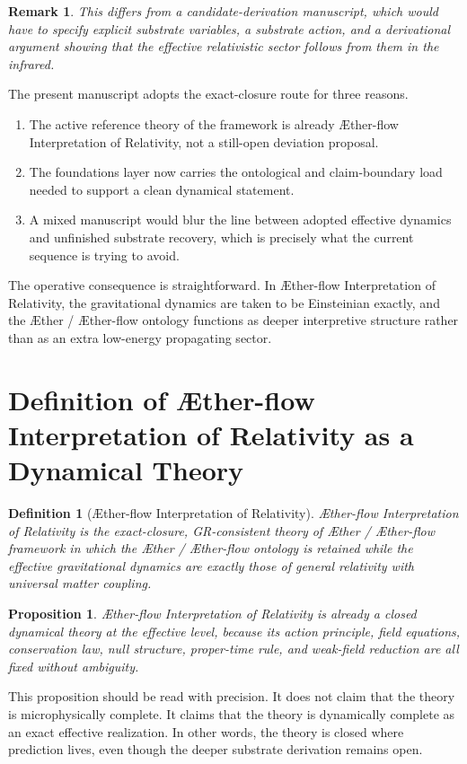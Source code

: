 \documentclass[11pt]{article}
\newcommand{\Aether}{\AE{}ther}
\newcommand{\Aflow}{\AE{}ther-flow}
\newcommand{\TheoryName}{\Aflow{} Interpretation of Relativity}
\newcommand{\TheoryProgram}{\Aether{} / \Aflow{} framework}
\newtheorem{definition}{Definition}
\newtheorem{proposition}{Proposition}
\newtheorem{remark}{Remark}
\begin{document}
\begin{remark}
This differs from a candidate-derivation manuscript, which would have to specify explicit substrate variables, a substrate action, and a derivational argument showing that the effective relativistic sector follows from them in the infrared.
\end{remark}

The present manuscript adopts the exact-closure route for three reasons.
\begin{enumerate}
    \item The active reference theory of the framework is already \TheoryName{}, not a still-open deviation proposal.
    \item The foundations layer now carries the ontological and claim-boundary load needed to support a clean dynamical statement.
    \item A mixed manuscript would blur the line between adopted effective dynamics and unfinished substrate recovery, which is precisely what the current sequence is trying to avoid.
\end{enumerate}

The operative consequence is straightforward. In \TheoryName{}, the gravitational dynamics are taken to be Einsteinian exactly, and the \Aether{} / \Aflow{} ontology functions as deeper interpretive structure rather than as an extra low-energy propagating sector.

\section{Definition of \TheoryName{} as a Dynamical Theory}

\begin{definition}[\TheoryName{}]
\TheoryName{} is the exact-closure, GR-consistent theory of \TheoryProgram{} in which the \Aether{} / \Aflow{} ontology is retained while the effective gravitational dynamics are exactly those of general relativity with universal matter coupling.
\end{definition}

\begin{proposition}
\TheoryName{} is already a closed dynamical theory at the effective level, because its action principle, field equations, conservation law, null structure, proper-time rule, and weak-field reduction are all fixed without ambiguity.
\end{proposition}

This proposition should be read with precision. It does not claim that the theory is microphysically complete. It claims that the theory is dynamically complete as an exact effective realization. In other words, the theory is closed where prediction lives, even though the deeper substrate derivation remains open.
\end{document}
